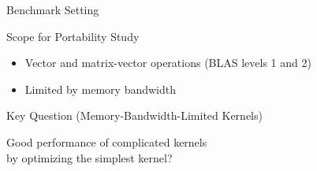

\begin{frame}{Benchmark Setting}

  \begin{block}{Scope for Portability Study}
    \begin{itemize}
     \item Vector and matrix-vector operations (BLAS levels 1 and 2)
     \item Limited by memory bandwidth
    \end{itemize}
  \end{block}

  \pause
  \begin{block}{Key Question (Memory-Bandwidth-Limited Kernels)}
    \begin{center} \color{red} \LARGE
     Good performance of complicated kernels \\
     by optimizing the simplest kernel?
    \end{center}
  \end{block}

\end{frame}


